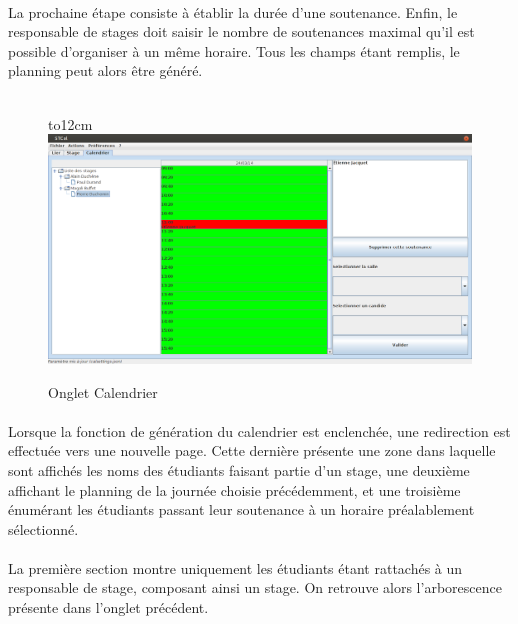 \documentclass[a4paper,10pt]{report}
\begin{document}
	      \paragraph{}
		La prochaine étape consiste à établir la durée d'une soutenance.
		Enfin, le responsable de stages doit saisir le nombre de soutenances maximal qu'il est possible d'organiser à un même horaire.
		Tous les champs étant remplis, le planning peut alors être généré.
		~\\~\\
		
		\begin{figure}[!h]
		\hbox to12cm{\hss\includegraphics[width=18cm]{Calendrier2.png}\hss}
		\caption{Onglet Calendrier}
		\end{figure}
		
	      \paragraph{}
		Lorsque la fonction de génération du calendrier est enclenchée, une redirection est effectuée vers une nouvelle page.
		Cette dernière présente une zone dans laquelle sont affichés les noms des étudiants faisant partie d'un stage, une deuxième affichant le planning de la journée choisie précédemment, et une troisième énumérant les étudiants passant leur soutenance à un horaire préalablement sélectionné.
		
	      \paragraph{}
		La première section montre uniquement les étudiants étant rattachés à un responsable de stage, composant ainsi un stage.
		On retrouve alors l'arborescence présente dans l'onglet précédent.
		
\end{document}
